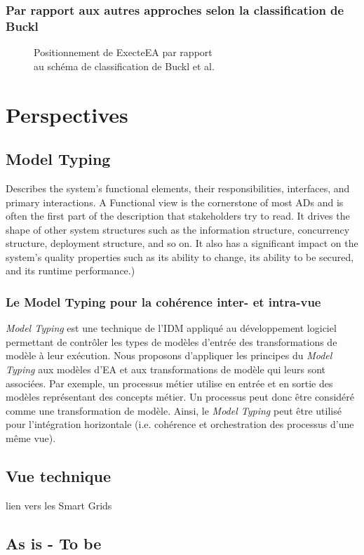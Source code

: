             \subsubsection{Par rapport aux autres approches selon la classification de Buckl}

\begin{figure}[!ht]
	
	\caption{Positionnement de ExecteEA par rapport\\au schéma de classification de
	Buckl et al. \protect\cite{buckl2009classifying}}
	\label{fig:positionBuckl}
\end{figure}

\section{Perspectives}

    \subsection{Model Typing}

 Describes the system’s functional elements, their responsibilities,
interfaces, and primary interactions. A Functional view is the cornerstone of
most ADs and is often the first part of the description that stakeholders try
to read. It drives the shape of other system structures such as the information
structure, concurrency structure, deployment structure, and so on. It also has a 
significant impact on the system’s quality properties such as its ability to
change, its ability to be secured, and its runtime performance.) 

\subsubsection{Le Model Typing pour la cohérence inter- et intra-vue}

\textit{Model Typing} est une technique de l'IDM appliqué au développement
logiciel permettant de contrôler les types de modèles d'entrée des
transformations de modèle à leur exécution. Nous proposons d'appliquer les
principes du \textit{Model Typing} aux modèles d'EA et aux transformations de
modèle qui leurs sont associées. Par exemple, un processus métier utilise en
entrée et en sortie des modèles représentant des concepts métier. Un processus
peut donc être considéré comme une transformation de modèle. Ainsi, le
\textit{Model Typing} peut être utilisé pour l'intégration horizontale (i.e.
cohérence et orchestration des processus d'une même vue).



    \subsection{Vue technique}
    lien vers les Smart Grids
    
    \subsection{As is - To be}

